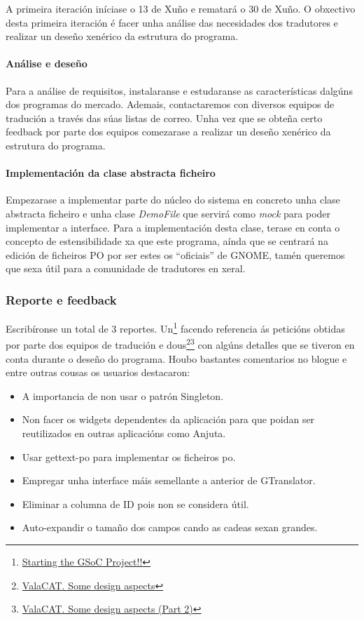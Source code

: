 A primeira iteración iníciase o 13 de Xuño e rematará o 30 de Xuño. O obxectivo desta primeira iteración é facer unha análise das necesidades dos tradutores e realizar un deseño xenérico da estrutura do programa.

\paragraph{Análise e deseño}
Para a análise de requisitos, instalaranse e estudaranse as características dalgúns dos programas do mercado. Ademais, contactaremos con diversos equipos de tradución a través das súas listas de correo. Unha vez que se obteña certo feedback por parte dos equipos comezarase a realizar un deseño xenérico da estrutura do programa.

\paragraph{Implementación da clase abstracta ficheiro}
Empezarase a implementar parte do núcleo do sistema en concreto unha clase abstracta ficheiro e unha clase \emph{DemoFile} que servirá como \emph{mock} para poder implementar a interface. Para a implementación desta clase, terase en conta o concepto de estensibilidade xa que este programa, aínda que se centrará na edición de ficheiros PO por ser estes os ``oficiais'' de GNOME, tamén queremos que sexa útil para a comunidade de tradutores en xeral.

\subsubsection{Reporte e feedback}
Escribíronse un total de 3 reportes. Un\footnote{\href{http://aquelando.info/startinggsocprojec/}{Starting the GSoC Project!!}} facendo referencia ás peticións obtidas por parte dos equipos de tradución e dous\footnote{\href{http://aquelando.info/valacat-some-design-aspects/}{ValaCAT. Some design aspects}}\footnote{\href{http://aquelando.info/valacat-some-design-aspects-part-2/}{ValaCAT. Some design aspects (Part 2)}} con algúns detalles que se tiveron en conta durante o deseño do programa. Houbo bastantes comentarios no blogue e entre outras cousas os usuarios destacaron:

\begin{itemize}
  \item A importancia de non usar o patrón Singleton.
  \item Non facer os widgets dependentes da aplicación para que poidan ser reutilizados en outras aplicacións como Anjuta.
  \item Usar gettext-po para implementar os ficheiros po.
  \item Empregar unha interface máis semellante a anterior de GTranslator.
  \item Eliminar a columna de ID pois non se considera útil.
  \item Auto-expandir o tamaño dos campos cando as cadeas sexan grandes.
\end{itemize}


